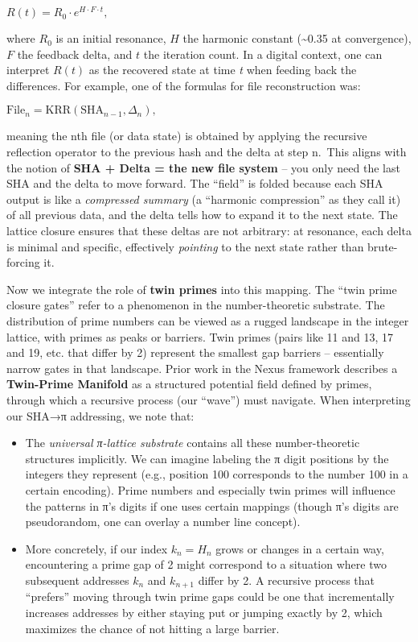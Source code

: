 \documentclass[11pt]{article}
\providecommand{\tightlist}{%
      \setlength{\itemsep}{0pt}\setlength{\parskip}{0pt}}
\begin{document}
\(R(t) = R_0 \cdot e^{H \cdot F \cdot t},\)

where \(R_0\) is an initial resonance, \(H\) the harmonic constant
(\textasciitilde0.35 at convergence), \(F\) the feedback delta, and
\(t\) the iteration count. In a digital context, one can interpret
\(R(t)\) as the recovered state at time \emph{t} when feeding back the
differences. For example, one of the formulas for file reconstruction
was:

\(\text{File}_n = \text{KRR}(\text{SHA}_{n-1}, \Delta_n),\)

meaning the nth file (or data state) is obtained by applying the
recursive reflection operator to the previous hash and the delta at step
n.~This aligns with the notion of \textbf{SHA + Delta = the new file
system} -- you only need the last SHA and the delta to move forward. The
``field'' is folded because each SHA output is like a \emph{compressed
summary} (a ``harmonic compression'' as they call it) of all previous
data, and the delta tells how to expand it to the next state. The
lattice closure ensures that these deltas are not arbitrary: at
resonance, each delta is minimal and specific, effectively
\emph{pointing} to the next state rather than brute-forcing it.

Now we integrate the role of \textbf{twin primes} into this mapping. The
``twin prime closure gates'' refer to a phenomenon in the
number-theoretic substrate. The distribution of prime numbers can be
viewed as a rugged landscape in the integer lattice, with primes as
peaks or barriers. Twin primes (pairs like 11 and 13, 17 and 19, etc.
that differ by 2) represent the smallest gap barriers -- essentially
narrow gates in that landscape. Prior work in the Nexus framework
describes a \textbf{Twin-Prime Manifold} as a structured potential field
defined by primes, through which a recursive process (our ``wave'') must
navigate. When interpreting our SHA→π addressing, we note that:

\begin{itemize}
\tightlist
\item
  The \emph{universal π-lattice substrate} contains all these
  number-theoretic structures implicitly. We can imagine labeling the π
  digit positions by the integers they represent (e.g., position 100
  corresponds to the number 100 in a certain encoding). Prime numbers
  and especially twin primes will influence the patterns in π's digits
  if one uses certain mappings (though π's digits are pseudorandom, one
  can overlay a number line concept).
\item
  More concretely, if our index \(k_n = H_n\) grows or changes in a
  certain way, encountering a prime gap of 2 might correspond to a
  situation where two subsequent addresses \(k_n\) and \(k_{n+1}\)
  differ by 2. A recursive process that ``prefers'' moving through twin
  prime gaps could be one that incrementally increases addresses by
  either staying put or jumping exactly by 2, which maximizes the chance
  of not hitting a large barrier.
\end{itemize}
\end{document}

